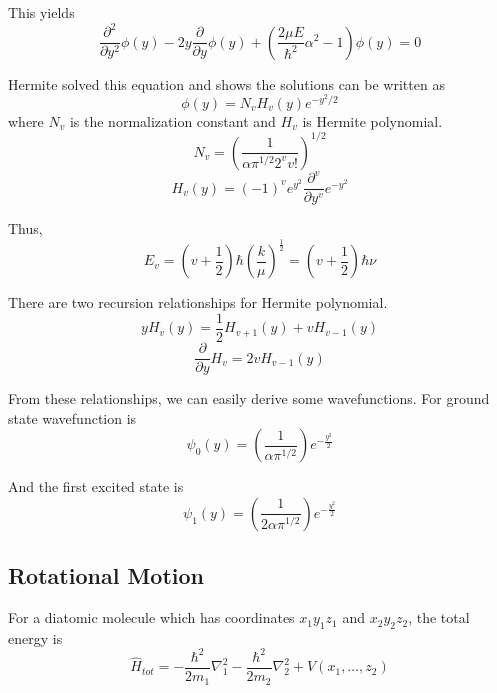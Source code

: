 \documentclass[letterpaper]{article}
\newcommand{\pd}[2]{\frac{\partial #1}{\partial #2}}
\newcommand{\pdd}[2]{\frac{\partial^2 #1}{\partial #2^2}}
\begin{document}
This yields
\begin{equation*}
    \pdd{}{y}\phi(y)-2y\pd{}{y}\phi(y)+\left(\frac{2\mu E}{\hbar^2}\alpha^2-1\right)\phi(y)=0
\end{equation*}

Hermite solved this equation and shows the solutions can be written as
\begin{equation*}
    \phi(y)=N_vH_v(y)e^{-y^2/2}
\end{equation*}
where $N_v$ is the normalization constant and $H_v$ is Hermite polynomial.
\begin{equation*}
    N_v=\left(\frac{1}{\alpha\pi^{1/2}2^vv!}\right)^{1/2}
\end{equation*}
\begin{equation*}
    H_v(y)=(-1)^ve^{y^2}\frac{\partial^v}{\partial y^v}e^{-y^2}
\end{equation*}

Thus,
\begin{equation*}
    E_v=(v+\frac{1}{2})\hbar\left(\frac{k}{\mu}\right)^{\frac{1}{2}}=(v+\frac{1}{2})\hbar\nu
\end{equation*}

There are two recursion relationships for Hermite polynomial.
\begin{equation*}
    yH_v(y)=\frac{1}{2}H_{v+1}(y)+vH_{v-1}(y)
\end{equation*}
\begin{equation*}
    \pd{}{y}H_v=2vH_{v-1}(y)
\end{equation*}

From these relationships, we can easily derive some wavefunctions. For ground state wavefunction is
\begin{equation*}
    \psi_0(y)=\left(\frac{1}{\alpha\pi^{1/2}}\right)e^{-\frac{y^2}{2}}
\end{equation*}

And the first excited state is
\begin{equation*}
    \psi_1(y)=\left(\frac{1}{2\alpha\pi^{1/2}}\right)e^{-\frac{y^2}{2}}
\end{equation*}
\subsection*{Rotational Motion}
For a diatomic molecule which has coordinates $x_1y_1z_1$ and $x_2y_2z_2$, the total energy is
\begin{equation*}
    \hat{H}_{tot}=-\frac{\hbar^2}{2m_1}\nabla_1^2-\frac{\hbar^2}{2m_2}\nabla_2^2+V(x_1,\dots,z_2)
\end{equation*}
\end{document}
